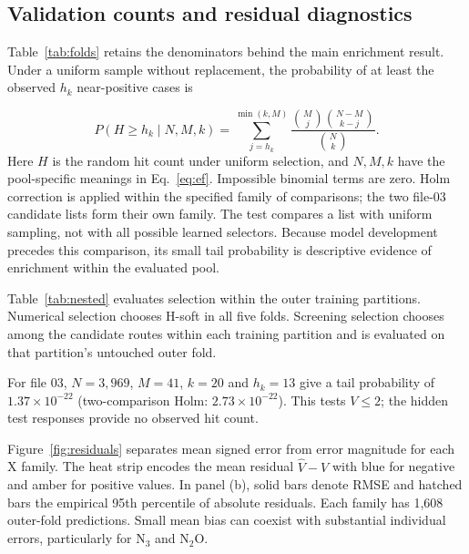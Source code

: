 \subsection{Validation counts and residual diagnostics}\label{app:validation}
Table~\ref{tab:folds} retains the denominators behind the main enrichment result. Under a uniform sample without replacement, the probability of at least the observed $h_k$ near-positive cases is
\begin{samepage}
\begin{equation}
 P(H\ge h_k\mid N,M,k)=
 \sum_{j=h_k}^{\min(k,M)}
 \frac{\binom{M}{j}\binom{N-M}{k-j}}{\binom{N}{k}}.
 \label{eq:hypergeom}
\end{equation}
\noindent Here $H$ is the random hit count under uniform selection, and $N,M,k$ have the pool-specific meanings in Eq.~\eqref{eq:ef}. Impossible binomial terms are zero. Holm correction is applied within the specified family of comparisons; the two file-03 candidate lists form their own family. The test compares a list with uniform sampling, not with all possible learned selectors. Because model development precedes this comparison, its small tail probability is descriptive evidence of enrichment within the evaluated pool.
\end{samepage}


Table~\ref{tab:nested} evaluates selection within the outer training partitions. Numerical selection chooses H-soft in all five folds. Screening selection chooses among the candidate routes within each training partition and is evaluated on that partition's untouched outer fold.

\begin{samepage}
For file 03, $N=3{,}969$, $M=41$, $k=20$ and $h_k=13$ give a tail probability of $1.37\times10^{-22}$ (two-comparison Holm: $2.73\times10^{-22}$). This tests $V\le2$; the hidden test responses provide no observed hit count.\par
\end{samepage}

Figure~\ref{fig:residuals} separates mean signed error from error magnitude for each X family. The heat strip encodes the mean residual $\widehat V-V$ with blue for negative and amber for positive values. In panel (b), solid bars denote RMSE and hatched bars the empirical 95th percentile of absolute residuals. Each family has 1,608 outer-fold predictions. Small mean bias can coexist with substantial individual errors, particularly for $\mathrm{N_3}$ and $\mathrm{N_2O}$.
\FloatBarrier

